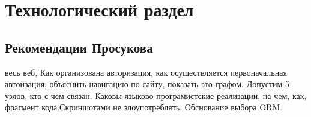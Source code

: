 \chapter{Технологический раздел}
\section{Рекомендации Просукова}
весь веб, Как организована авторизация, как осуществляется первоначальная автоизация, объяснить навигацию по сайту, показать это графом. Допустим 5 узлов, кто с чем связан.
Каковы языково-програмистские реализации, на чем, как, фрагмент кода.Скриншотами не злоупотреблять.  Обснование выбора ORM.

